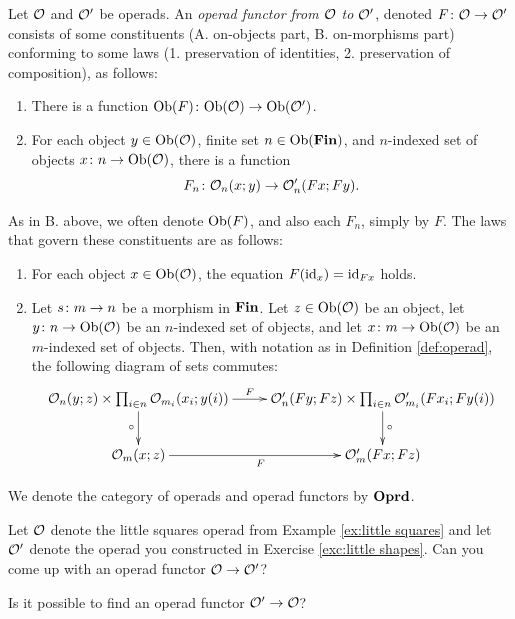 \documentclass[CT4S-EN-RU]{subfiles}
\begin{document}
\begin{definition}\label{def:operad morphism}

Let $\mathcal{O}$ and $\mathcal{O}'$ be operads. An {\em operad functor from $\mathcal{O}$ to $\mathcal{O}'$}, denoted $F\colon\mathcal{O}\rightarrow\mathcal{O}'$ consists of some constituents (A. on-objects part, B. on-morphisms part) conforming to some laws (1. preservation of identities, 2. preservation of composition), as follows:
\begin{enumerate}[\hsp A.]
\item There is a function $\textnormal{Ob}(F)\colon\textnormal{Ob}(\mathcal{O})\rightarrow\textnormal{Ob}(\mathcal{O}')$.
\item For each object $y\in\textnormal{Ob}(\mathcal{O})$, finite set $n\in\textnormal{Ob}({\bf Fin})$, and $n$-indexed set of objects $x\colon n\rightarrow\textnormal{Ob}(\mathcal{O})$, there is a function $$F_n\colon\mathcal{O}_n(x;y)\rightarrow\mathcal{O}'_n(Fx;Fy).$$
\end{enumerate}
As in B. above, we often denote $\textnormal{Ob}(F)$, and also each $F_n$, simply by $F$. The laws that govern these constituents are as follows:
\begin{enumerate}[\hsp 1.]
\item For each object $x\in\textnormal{Ob}(\mathcal{O})$, the equation $F(\textnormal{id}_x)=\textnormal{id}_{Fx}$ holds.
\item Let $s\colon m\rightarrow n$ be a morphism in ${\bf Fin}$. Let $z\in\textnormal{Ob}(\mathcal{O})$ be an object, let $y\colon n\rightarrow\textnormal{Ob}(\mathcal{O})$ be an $n$-indexed set of objects, and let $x\colon m\rightarrow\textnormal{Ob}(\mathcal{O})$ be an $m$-indexed set of objects. Then, with notation as in Definition \ref{def:operad}, the following diagram of sets commutes:
\begin{align}\label{dia:operad functor on composition}
\xymatrix{
\mcO_n(y;z)\times\prod_{i\in n}\mcO_{m_i}(x_i;y(i))\ar[r]^-F\ar[d]_\circ&
\mcO'_n(Fy;Fz)\times\prod_{i\in n}\mcO'_{m_i}(Fx_i;Fy(i))\ar[d]^\circ\\
\mcO_m(x;z)\ar[r]_F&\mcO'_m(Fx;Fz)
}
\end{align}
\end{enumerate}

We denote the category of operads and operad functors by ${\bf Oprd}$.

\end{definition}

\begin{exercise}
Let $\mathcal{O}$ denote the little squares operad from Example \ref{ex:little squares} and let $\mathcal{O}'$ denote the operad you constructed in Exercise \ref{exc:little shapes}.
\sexc Can you come up with an operad functor $\mathcal{O}\rightarrow\mathcal{O}'$?
\item Is it possible to find an operad functor $\mathcal{O}'\rightarrow\mathcal{O}$? 
\endsexc
\end{exercise}
\end{document}

